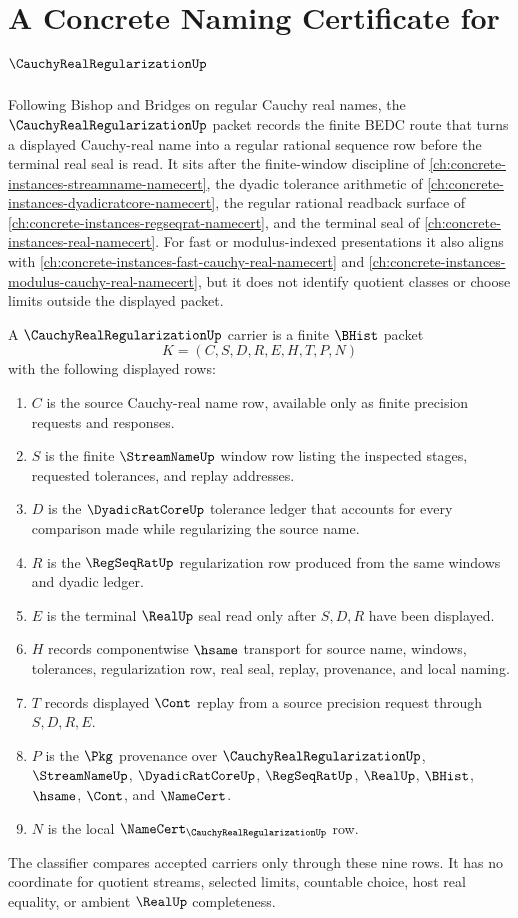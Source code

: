 \chapter{A Concrete Naming Certificate for $\CauchyRealRegularizationUp$}
\label{ch:concrete-instances-cauchy-real-regularization-namecert}

Following Bishop and Bridges on regular Cauchy real names, the $\CauchyRealRegularizationUp$ packet records the finite BEDC route that turns a displayed Cauchy-real name into a regular rational sequence row before the terminal real seal is read. It sits after the finite-window discipline of \autoref{ch:concrete-instances-streamname-namecert}, the dyadic tolerance arithmetic of \autoref{ch:concrete-instances-dyadicratcore-namecert}, the regular rational readback surface of \autoref{ch:concrete-instances-regseqrat-namecert}, and the terminal seal of \autoref{ch:concrete-instances-real-namecert}. For fast or modulus-indexed presentations it also aligns with \autoref{ch:concrete-instances-fast-cauchy-real-namecert} and \autoref{ch:concrete-instances-modulus-cauchy-real-namecert}, but it does not identify quotient classes or choose limits outside the displayed packet.

\begin{definition}
\label{def:cauchy-real-regularization-carrier}
A $\CauchyRealRegularizationUp$ carrier is a finite $\BHist$ packet
$$
K=(C,S,D,R,E,H,T,P,N)
$$
with the following displayed rows:
\begin{enumerate}
\item $C$ is the source Cauchy-real name row, available only as finite precision requests and responses.
\item $S$ is the finite $\StreamNameUp$ window row listing the inspected stages, requested tolerances, and replay addresses.
\item $D$ is the $\DyadicRatCoreUp$ tolerance ledger that accounts for every comparison made while regularizing the source name.
\item $R$ is the $\RegSeqRatUp$ regularization row produced from the same windows and dyadic ledger.
\item $E$ is the terminal $\RealUp$ seal read only after $S,D,R$ have been displayed.
\item $H$ records componentwise $\hsame$ transport for source name, windows, tolerances, regularization row, real seal, replay, provenance, and local naming.
\item $T$ records displayed $\Cont$ replay from a source precision request through $S,D,R,E$.
\item $P$ is the $\Pkg$ provenance over $\CauchyRealRegularizationUp$, $\StreamNameUp$, $\DyadicRatCoreUp$, $\RegSeqRatUp$, $\RealUp$, $\BHist$, $\hsame$, $\Cont$, and $\NameCert$.
\item $N$ is the local $\NameCert_{\CauchyRealRegularizationUp}$ row.
\end{enumerate}
The classifier compares accepted carriers only through these nine rows. It has no coordinate for quotient streams, selected limits, countable choice, host real equality, or ambient $\RealUp$ completeness.
\end{definition}

